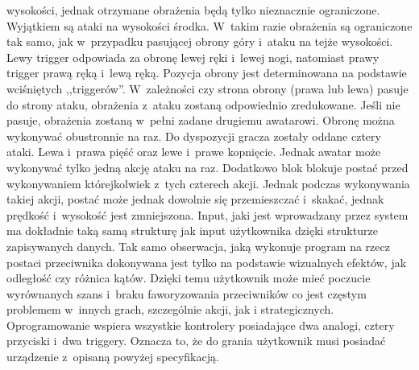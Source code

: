 \documentclass[brudnopis]{xmgr}
\begin{document}
wysokości, jednak otrzymane obrażenia będą tylko
nieznacznie ograniczone. Wyjątkiem są ataki na wysokości środka. W~takim
razie obrażenia są ograniczone tak samo, jak w~przypadku pasującej obrony
góry i~ataku na tejże wysokości. Lewy trigger
odpowiada za obronę lewej ręki i~lewej nogi, natomiast prawy trigger
prawą ręką i~lewą ręką. Pozycja obrony jest determinowana na podstawie
wciśniętych ,,triggerów''. W~zależności czy strona obrony (prawa lub lewa)
pasuje do strony ataku, obrażenia z~ataku zostaną odpowiednio
zredukowane. Jeśli nie pasuje, obrażenia zostaną w~pełni zadane drugiemu
awatarowi. Obronę można wykonywać obustronnie na raz.
Do dyspozycji gracza zostały oddane cztery ataki. Lewa i~prawa pięść oraz
lewe i~prawe kopnięcie. Jednak awatar może wykonywać tylko jedną akcję
ataku na raz. Dodatkowo blok blokuje postać przed wykonywaniem
którejkolwiek z~tych czterech akcji. Jednak podczas wykonywania takiej 
akcji, postać może jednak dowolnie się przemieszczać i~skakać, jednak
prędkość i~wysokość jest zmniejszona. Input, jaki jest wprowadzany przez system ma dokładnie taką samą strukturę jak input użytkownika
dzięki strukturze zapisywanych danych. Tak samo
obserwacja, jaką wykonuje program na rzecz postaci przeciwnika dokonywana jest tylko na
podstawie wizualnych efektów, jak odległość czy różnica kątów. Dzięki temu
użytkownik może mieć poczucie wyrównanych szans i~braku faworyzowania przeciwników
co jest częstym problemem w~innych grach, szczególnie akcji, jak i strategicznych. Oprogramowanie wspiera wszystkie kontrolery posiadające dwa analogi, cztery
przyciski i~dwa triggery. Oznacza to, że do grania użytkownik musi posiadać
urządzenie z~opisaną powyżej
specyfikacją.
\end{document}

